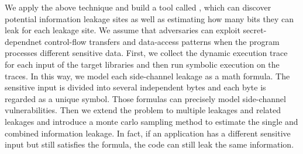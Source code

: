 We apply the above technique and build a tool called \tool{}, 
which can discover potential information leakage sites 
as well as estimating how many bits they can leak for each leakage site. 
We assume that adversaries can exploit secret-dependnet control-flow transfers and 
data-access patterns when the program processes different sensitive data. 
First, we collect the dynamic execution trace for each input of the target libraries 
and then run symbolic execution on the traces. 
In this way, we model each side-channel leakage as a math formula. 
The sensitive input is divided into several independent bytes and each byte is regarded as 
a unique symbol. Those formulas can precisely model side-channel vulnerabilities.
Then we extend the problem to multiple leakages and related leakages
and introduce a monte carlo sampling method to estimate the single and combined information leakage.
In fact, if an application has a different sensitive input but still satisfies the formula, 
the code can still leak the same information. 





